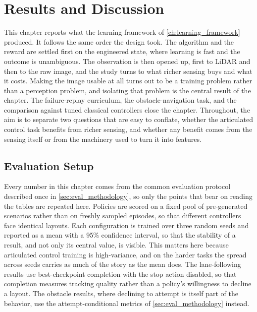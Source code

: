\chapter{Results and Discussion}
\label{ch:results}

\newcommand{\pending}[1]{\textcolor{red}{[pending: #1]}}

This chapter reports what the learning framework of \cref{ch:learning_framework} produced. It follows the same order the design took. The algorithm and the reward are settled first on the engineered state, where learning is fast and the outcome is unambiguous. The observation is then opened up, first to LiDAR and then to the raw image, and the study turns to what richer sensing buys and what it costs. Making the image usable at all turns out to be a training problem rather than a perception problem, and isolating that problem is the central result of the chapter. The failure-replay curriculum, the obstacle-navigation task, and the comparison against tuned classical controllers close the chapter. Throughout, the aim is to separate two questions that are easy to conflate, whether the articulated control task benefits from richer sensing, and whether any benefit comes from the sensing itself or from the machinery used to turn it into features.

\section{Evaluation Setup}
\label{sec:eval_setup}

Every number in this chapter comes from the common evaluation protocol described once in \cref{sec:eval_methodology}, so only the points that bear on reading the tables are repeated here. Policies are scored on a fixed pool of pre-generated scenarios rather than on freshly sampled episodes, so that different controllers face identical layouts. Each configuration is trained over three random seeds and reported as a mean with a 95\% confidence interval, so that the stability of a result, and not only its central value, is visible. This matters here because articulated control training is high-variance, and on the harder tasks the spread across seeds carries as much of the story as the mean does. The lane-following results use best-checkpoint completion with the stop action disabled, so that completion measures tracking quality rather than a policy's willingness to decline a layout. The obstacle results, where declining to attempt is itself part of the behavior, use the attempt-conditional metrics of \cref{sec:eval_methodology} instead.

